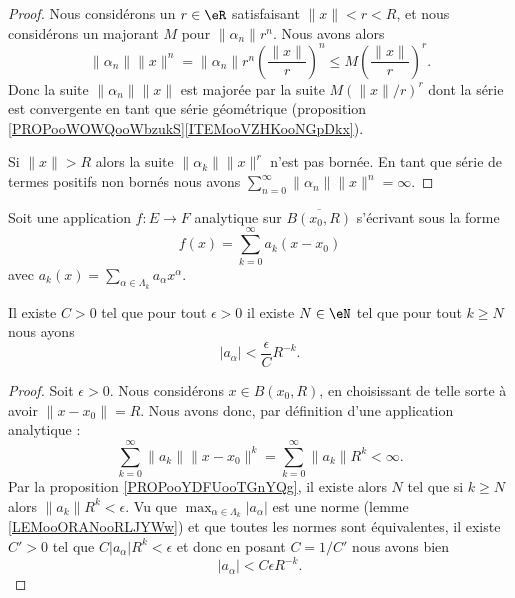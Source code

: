 \begin{proof}
	Nous considérons un \( r\in \eR\) satisfaisant \( \| x \|<r<R\), et nous considérons un majorant \( M\) pour \( \| \alpha_n \|r^n\). Nous avons alors
	\begin{equation}
		\| \alpha_n \|\| x \|^n=\| \alpha_n \|r^n\left( \frac{ \| x \| }{ r } \right)^n\leq M\left( \frac{ \| x \| }{ r } \right)^r.
	\end{equation}
	Donc la suite \( \| \alpha_n \|\| x \|\) est majorée par la suite \( M(\| x \|/r)^r\) dont la série est convergente en tant que série géométrique (proposition \ref{PROPooWOWQooWbzukS}\ref{ITEMooVZHKooNGpDkx}).

	Si \( \| x \|>R\) alors la suite \( \| \alpha_k \|\| x \|^r\) n'est pas bornée. En tant que série de termes positifs non bornés nous avons \( \sum_{n=0}^{\infty}\| \alpha_n \|\| x \|^n=\infty\).
\end{proof}

\begin{lemma}	\label{LEMooZDPSooXxPkYs}
	Soit une application \(f \colon E\to F  \) analytique sur \( \overline{B(x_0,R)}\) s'écrivant sous la forme
	\begin{equation}
		f(x)=\sum_{k=0}^{\infty}a_k(x-x_0)
	\end{equation}
	avec \( a_k(x)=\sum_{\alpha\in\Lambda_k}a_{\alpha}x^{\alpha}\).

	Il existe \( C>0\) tel que pour tout \( \epsilon>0\) il existe \( N\in \eN\) tel que pour tout \( k\geq N\) nous ayons
	\begin{equation}
		| a_{\alpha} |<\frac{ \epsilon }{ C }R^{-k}.
	\end{equation}
\end{lemma}

\begin{proof}
	Soit \( \epsilon>0\). Nous considérons \( x\in B(x_0,R)\), en choisissant de telle sorte à avoir \( \| x-x_0 \|=R\). Nous avons donc, par définition d'une application analytique :
	\begin{equation}
		\sum_{k=0}^{\infty}\| a_k \|\| x-x_0 \|^k=\sum_{k=0}^{\infty}\| a_k \|R^k<\infty.
	\end{equation}
	Par la proposition \ref{PROPooYDFUooTGnYQg}, il existe alors \( N\) tel que si \( k\geq N\) alors \( \| a_k \|R^k<\epsilon\). Vu que \( \max_{\alpha\in\Lambda_k}| a_{\alpha} |\) est une norme (lemme \ref{LEMooORANooRLJYWw}) et que toutes les normes sont équivalentes, il existe \( C'>0\) tel que  \( C| a_{\alpha} |R^k<\epsilon\) et donc en posant \( C=1/C'\) nous avons bien
	\begin{equation}
		| a_{\alpha} |<C\epsilon R^{-k}.
	\end{equation}
\end{proof}

